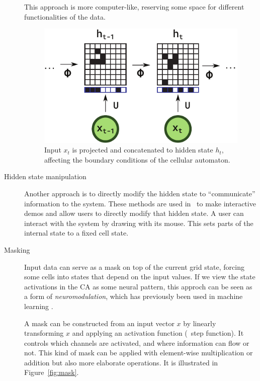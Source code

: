 \begin{description}
This approach is more computer-like, reserving some space for different
functionalities of the data.

\begin{figure}[ht]
  \centering
  \includegraphics[width=.5\linewidth]{figures/concat.pdf}
  \caption{\label{fig:concat} Input $x_t$ is projected and concatenated to
    hidden state $h_t$, affecting the boundary conditions of the cellular
    automaton.}
\end{figure}

\item[Hidden state manipulation]

Another approach is to directly modify the hidden state to ``communicate''
information to the system. These methods are used
in~\parencite{mordvintsevGrowingNeuralCellular2020,
  randazzoSelfclassifyingMNISTDigits2020} to make interactive demos and allow
users to directly modify that hidden state. A user can interact with the
system by drawing with its mouse. This sets parts of the internal state to a
fixed cell state.

\item[Masking] Input data can serve as a mask on top of the current grid
state, forcing some cells into states that depend on the input values. If we
view the state activations in the CA as some neural pattern, this approch can
be seen as a form of \emph{neuromodulation}, which has previously been used in
machine learning \parencite{soltoggioEvolutionaryAdvantagesNeuromodulated2008,
  ishiguroNeuromodulatedControlBipedal2003,
  beaulieuLearningContinuallyLearn2020}.

A mask can be constructed from an input
vector $x$ by linearly transforming $x$ and applying an activation function
(\eg~step function). It controls which channels are activated, and where
information can flow or not. This kind of mask can be applied with element-wise
multiplication or addition but also more elaborate operations. It is illustrated
in Figure~\ref{fig:mask}.


\end{description}
